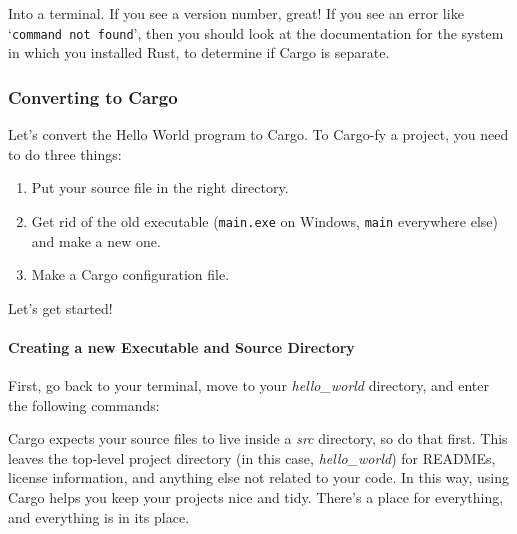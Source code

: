 \documentclass[a4paper,]{book}
\newenvironment{Shaded}{\begin{snugshade}}{\end{snugshade}}
\newcommand{\KeywordTok}[1]{\textcolor[rgb]{0.13,0.29,0.53}{\textbf{{#1}}}}
\newcommand{\CommentTok}[1]{\textcolor[rgb]{0.56,0.35,0.01}{\textit{{#1}}}}
\newcommand{\NormalTok}[1]{{#1}}
\let\oldparagraph\paragraph
\renewcommand{\paragraph}[1]{\oldparagraph{#1}\mbox{}}
\begin{document}
\begin{Shaded}
\end{Shaded}

Into a terminal. If you see a version number, great! If you see an error
like `\texttt{command\ not\ found}', then you should look at the
documentation for the system in which you installed Rust, to determine
if Cargo is separate.

\subsubsection{Converting to Cargo}\label{converting-to-cargo}

Let's convert the Hello World program to Cargo. To Cargo-fy a project,
you need to do three things:

\begin{enumerate}
\def\labelenumi{\arabic{enumi}.}
\itemsep1pt\parskip0pt
\item
  Put your source file in the right directory.
\item
  Get rid of the old executable (\texttt{main.exe} on Windows,
  \texttt{main} everywhere else) and make a new one.
\item
  Make a Cargo configuration file.
\end{enumerate}

Let's get started!

\paragraph{Creating a new Executable and Source
Directory}\label{creating-a-new-executable-and-source-directory}

First, go back to your terminal, move to your \emph{hello\_world}
directory, and enter the following commands:

\begin{Shaded}
\end{Shaded}

Cargo expects your source files to live inside a \emph{src} directory,
so do that first. This leaves the top-level project directory (in this
case, \emph{hello\_world}) for READMEs, license information, and
anything else not related to your code. In this way, using Cargo helps
you keep your projects nice and tidy. There's a place for everything,
and everything is in its place.
\end{document}
